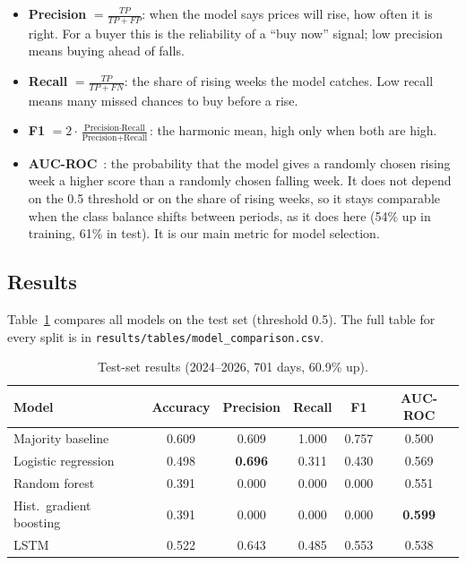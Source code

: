 \begin{itemize}
  \item \textbf{Precision} $= \frac{TP}{TP + FP}$: when the model says prices
        will rise, how often it is right. For a buyer this is the reliability
        of a ``buy now'' signal; low precision means buying ahead of falls.
  \item \textbf{Recall} $= \frac{TP}{TP + FN}$: the share of rising weeks the
        model catches. Low recall means many missed chances to buy before a rise.
  \item \textbf{F1} $= 2 \cdot \frac{\text{Precision} \cdot \text{Recall}}{\text{Precision} + \text{Recall}}$:
        the harmonic mean, high only when both are high.
  \item \textbf{AUC-ROC}~\cite{a_fawcett2006}: the probability that the model
        gives a randomly chosen rising week a higher score than a randomly
        chosen falling week. It does not depend on the 0.5 threshold or on the
        share of rising weeks, so it stays comparable when the class balance
        shifts between periods, as it does here (54\% up in training, 61\% in
        test). It is our main metric for model selection.
\end{itemize}

\subsection{Results}

Table~\ref{tab:test-results} compares all models on the test set (threshold
0.5). The full table for every split is in
\texttt{results/tables/model\_comparison.csv}.

\begin{table}[H]
  \centering
  \begin{tabular}{lccccc}
    \toprule
    Model & Accuracy & Precision & Recall & F1 & AUC-ROC \\
    \midrule
    Majority baseline        & 0.609 & 0.609 & 1.000 & 0.757 & 0.500 \\
    Logistic regression      & 0.498 & \textbf{0.696} & 0.311 & 0.430 & 0.569 \\
    Random forest            & 0.391 & 0.000 & 0.000 & 0.000 & 0.551 \\
    Hist.\ gradient boosting & 0.391 & 0.000 & 0.000 & 0.000 & \textbf{0.599} \\
    LSTM                     & 0.522 & 0.643 & 0.485 & 0.553 & 0.538 \\
    \bottomrule
  \end{tabular}
  \caption{Test-set results (2024--2026, 701 days, 60.9\% up).}
  \label{tab:test-results}
\end{table}

